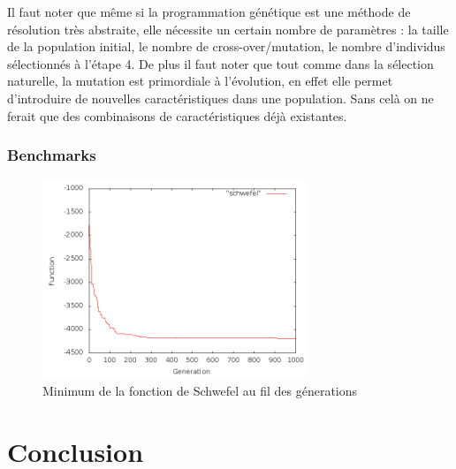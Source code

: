 \documentclass{report}
\begin{document}
Il faut noter que même si la programmation génétique est une méthode
de résolution très abstraite, elle nécessite un certain nombre de
paramètres : la taille de la population initial, le nombre de
cross-over/mutation, le nombre d'individus sélectionnés à l'étape 4.
De plus il faut noter que tout comme dans la sélection naturelle, la
mutation est primordiale à l'évolution, en effet elle permet
d'introduire de nouvelles caractéristiques dans une population. Sans
celà on ne ferait que des combinaisons de caractéristiques déjà
existantes.

\subsection{Benchmarks}


\begin{figure}[H]
  \centering
  \includegraphics[width=300px]{genetic_schwefel.png}
  \caption{Minimum de la fonction de Schwefel au fil des génerations}
  \label{geneticschwefel}
\end{figure}


\chapter{Conclusion}
\end{document}
